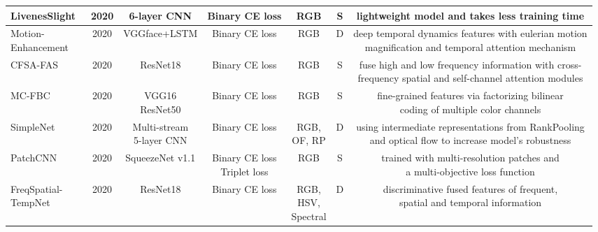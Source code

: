 \documentclass[10pt,journal,compsoc]{IEEEtran}
\begin{document}
\begin{table}
{\begin{tabular}{l c c c c c c}
   \midrule
LivenesSlight~\cite{zuo2020face} & 2020 & 6-layer CNN  & Binary CE loss & RGB & S & lightweight model and takes less training time\\ 
 
   \midrule
\tabincell{c}{Motion-\\Enhancement}~\cite{ge2020face} & 2020 & VGGface+LSTM  & Binary CE loss & RGB & D & \tabincell{c}{deep temporal dynamics features with eulerian motion\\
magnification and temporal attention mechanism}  \\  
 
   \midrule
CFSA-FAS~\cite{chen2020face} & 2020 & ResNet18  & Binary CE loss & RGB & S & \tabincell{c}{fuse high and low frequency information with cross-\\frequency spatial and self-channel attention modules}  \\   
 
  
 
   \midrule
MC-FBC~\cite{jia20203d} & 2020 & \tabincell{c}{VGG16\\ResNet50}  & Binary CE loss & RGB & S & \tabincell{c}{fine-grained features via factorizing bilinear\\ coding of multiple color channels}  \\   
 

   \midrule
SimpleNet~\cite{parkin2020creating} & 2020 & \tabincell{c}{Multi-stream \\5-layer CNN}  & Binary CE loss & \tabincell{c}{RGB, \\OF, RP} & D & \tabincell{c}{using intermediate representations from RankPooling\\ and optical flow to increase model's robustness}  \\   


   \midrule
PatchCNN~\cite{almeida2020detecting} & 2020 & SqueezeNet v1.1  & \tabincell{c}{Binary CE loss\\Triplet loss} & RGB & S & \tabincell{c}{trained with multi-resolution patches and \\a multi-objective loss function}  \\ 

   \midrule
\tabincell{c}{FreqSpatial-\\TempNet}~\cite{huang2020deep} & 2020 & ResNet18  & Binary CE loss & \tabincell{c}{RGB,\\HSV,\\Spectral} & D & \tabincell{c}{discriminative fused features of  frequent, \\spatial and temporal information}  \\ 



\end{tabular}}
\end{table}
\end{document}
